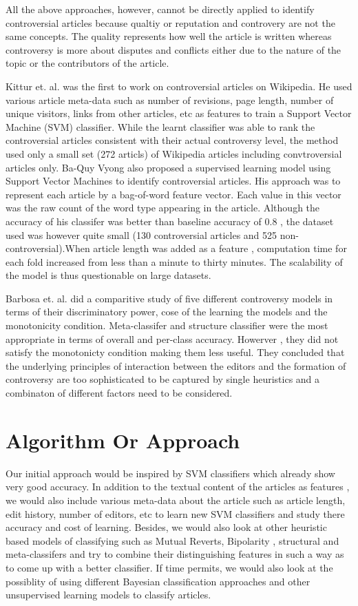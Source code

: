 \documentclass[twocolumn]{article}
\begin{document}
  All the above approaches, however, cannot be directly applied to
  identify controversial articles because qualtiy or reputation and
  controvery are not the same concepts. The quality represents how
  well the article is written whereas controversy is more about
  disputes and conflicts either due to the nature of the topic or the
  contributors of the article.

  Kittur et. al. was the first to work on controversial articles on
  Wikipedia. He used various article meta-data such as number of
  revisions, page length, number of unique visitors, links from other
  articles, etc as features to train a Support Vector Machine (SVM)
  classifier. While the learnt classifier was able to rank the
  controversial articles consistent with their actual controversy
  level, the method used only a small set (272 articls) of Wikipedia
  articles including convtroversial articles only.
  Ba-Quy Vyong also proposed a supervised learning model using Support
  Vector Machines to identify controversial articles. His approach was
  to represent each article by a bag-of-word feature vector. Each
  value in this vector was the raw count of the word type appearing in
  the article. Although the accuracy of his classifer was better than
  baseline accuracy of 0.8 , the dataset used was however quite
  small (130 controversial articles and 525 non-controversial).When
  article length was added as a feature , computation time for each
  fold increased from less than a minute to thirty minutes. The
  scalability of the model is thus questionable on large datasets.

  Barbosa et. al. did a comparitive study of five different
  controversy models in terms of their discriminatory power, cose of
  the learning the models and the monotonicity condition.
  Meta-classifer and structure classifier were the most appropriate
  in terms of overall and per-class accuracy. Howerver , they did not
  satisfy the monotonicty condition making them less useful. They
  concluded that the underlying principles of interaction between the
  editors and the formation of controversy are too sophisticated to be
  captured by single heuristics and a combinaton of different factors
  need to be considered.


\section{Algorithm Or Approach}

    
  Our initial approach would be inspired by SVM classifiers which
    already show
very good accuracy. In addition to the textual content of the articles
as features , we would also include various meta-data about the
article such as article length, edit history, number of editors, etc
to learn new SVM classifiers and study there accuracy and cost of
learning. Besides, we would also look at other heuristic based models
of classifying such as Mutual Reverts, Bipolarity , structural and
meta-classifers and try to combine their distinguishing features in
such a way as to come up with a better classifier. If time permits, we
would also look at the possiblity of using different Bayesian
classification approaches and other unsupervised learning models to
classify articles. 
\end{document}
